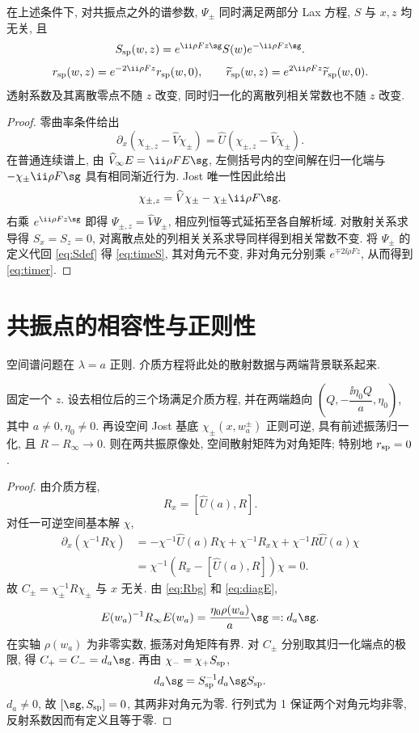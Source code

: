\begin{proposition}[散射数据的演化]\label{prop:evolution}
在上述条件下, 对共振点之外的谱参数, $\Psi_\pm$ 同时满足两部分 Lax 方程, $S$ 与 $x,z$ 均无关, 且
\begin{equation}\label{eq:timeS}
S_{\rm sp}(w,z)=e^{\ii\rho Fz\sg}S(w)e^{-\ii\rho Fz\sg}.
\end{equation}
\begin{equation}\label{eq:timer}
r_{\rm sp}(w,z)=e^{-2\ii\rho Fz}r_{\rm sp}(w,0),\qquad
\widetilde r_{\rm sp}(w,z)=e^{2\ii\rho Fz}\widetilde r_{\rm sp}(w,0).
\end{equation}
透射系数及其离散零点不随 $z$ 改变, 同时归一化的离散列相关常数也不随 $z$ 改变.
\end{proposition}
\begin{proof}
零曲率条件给出
\[
\partial_x(\chi_{\pm,z}-\widehat V\chi_\pm)
=\widehat U(\chi_{\pm,z}-\widehat V\chi_\pm).
\]
在普通连续谱上, 由 $\widehat V_\infty E=\ii\rho F E\sg$, 左侧括号内的空间解在归一化端与
$-\chi_\pm\ii\rho F\sg$ 具有相同渐近行为. Jost 唯一性因此给出
\[
\chi_{\pm,z}=\widehat V\chi_\pm-\chi_\pm\ii\rho F\sg.
\]
右乘 $e^{\ii\rho Fz\sg}$ 即得 $\Psi_{\pm,z}=\widehat V\Psi_\pm$, 相应列恒等式延拓至各自解析域. 对散射关系求导得 $S_x=S_z=0$, 对离散点处的列相关关系求导同样得到相关常数不变. 将 $\Psi_\pm$ 的定义代回 \eqref{eq:Sdef} 得 \eqref{eq:timeS}, 其对角元不变, 非对角元分别乘 $e^{\mp2\ii\rho Fz}$, 从而得到 \eqref{eq:timer}.
\end{proof}

\section{共振点的相容性与正则性}
空间谱问题在 $\lambda=a$ 正则. 介质方程将此处的散射数据与两端背景联系起来.
\begin{proposition}[固定传播截面的共振反射条件]\label{prop:resonance}
固定一个 $z$. 设去相位后的三个场满足介质方程, 并在两端趋向 $(Q,-\dfrac{\ii\eta_0Q}{a},\eta_0)$, 其中 $a\ne0,\eta_0\ne0$. 再设空间 Jost 基底 $\chi_\pm(x,w_a^\pm)$ 正则可逆, 具有前述振荡归一化, 且 $R-R_\infty\to0$. 则在两共振原像处, 空间散射矩阵为对角矩阵; 特别地 $r_{\rm sp}=0$.
\end{proposition}
\begin{proof}
由介质方程,
\[
R_x=[\widehat U(a),R].
\]
对任一可逆空间基本解 $\chi$,
\begin{align*}
\partial_x(\chi^{-1}R\chi)
&=-\chi^{-1}\widehat U(a)R\chi
+\chi^{-1}R_x\chi+\chi^{-1}R\widehat U(a)\chi\\
&=\chi^{-1}(R_x-[\widehat U(a),R])\chi=0.
\end{align*}
故 $C_\pm=\chi_\pm^{-1}R\chi_\pm$ 与 $x$ 无关. 由 \eqref{eq:Rbg} 和 \eqref{eq:diagE},
\[
E(w_a)^{-1}R_\infty E(w_a)=
\dfrac{\eta_0\rho(w_a)}{a}\sg=:d_a\sg.
\]
在实轴 $\rho(w_a)$ 为非零实数, 振荡对角矩阵有界. 对 $C_\pm$ 分别取其归一化端点的极限, 得 $C_+=C_-=d_a\sg$. 再由 $\chi_-=\chi_+S_{\rm sp}$,
\[
d_a\sg=S_{\rm sp}^{-1}d_a\sg S_{\rm sp}.
\]
$d_a\ne0$, 故 $[\sg,S_{\rm sp}]=0$, 其两非对角元为零. 行列式为 1 保证两个对角元均非零, 反射系数因而有定义且等于零.
\end{proof}

